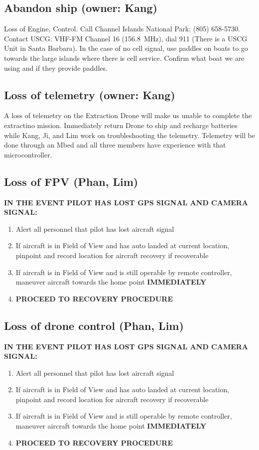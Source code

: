 \subsection{Abandon ship (owner: Kang)}
Loss of Engine, Control. Call Channel Islands National Park: (805) 658-5730. Contact USCG: VHF-FM Channel 16 (\SI{156.8}{\mega\hertz}), dial 911 (There is a USCG Unit in Santa Barbara). In the case of no cell signal, use paddles on boats to go towards the large islands where there is cell service. Confirm what boat we are using and if they provide paddles.


\subsection{Loss of telemetry (owner: Kang)}
A loss of telemetry on the Extraction Drone will make us unable to complete the extractino mission. Immediately return Drone to ship and recharge batteries while Kang, Ji, and Lim work on troubleshooting the telemetry. Telemetry will be done through an Mbed and all three members have experience with that microcontroller.


\subsection{Loss of FPV (Phan, Lim)}

\textbf{IN THE EVENT PILOT HAS LOST GPS SIGNAL AND CAMERA SIGNAL:}
\begin{enumerate}
\setlength{\itemsep}{0em}
\setlength{\parskip}{0em}
\item Alert all personnel that pilot has lost aircraft signal
\item If aircraft is in Field of View and has auto landed at current location, pinpoint and record location for aircraft recovery if recoverable
\item If aircraft is in Field of View and is still operable by remote controller, maneuver aircraft towards the home point \textbf{IMMEDIATELY}
\item \textbf{PROCEED TO RECOVERY PROCEDURE}
\end{enumerate}


\subsection{Loss of drone control (Phan, Lim)}

\textbf{IN THE EVENT PILOT HAS LOST GPS SIGNAL AND CAMERA SIGNAL:}
\begin{enumerate}
\setlength{\itemsep}{0em}
\setlength{\parskip}{0em}
\item Alert all personnel that pilot has lost aircraft signal
\item If aircraft is in Field of View and has auto landed at current location, pinpoint and record location for aircraft recovery if recoverable
\item If aircraft is in Field of View and is still operable by remote controller, maneuver aircraft towards the home point \textbf{IMMEDIATELY}
\item \textbf{PROCEED TO RECOVERY PROCEDURE}
\end{enumerate}


